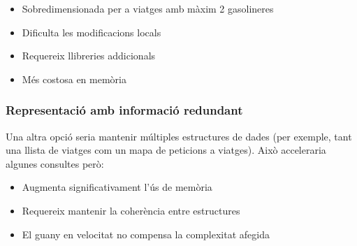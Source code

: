 \begin{itemize}
    \item Sobredimensionada per a viatges amb màxim 2 gasolineres
    \item Dificulta les modificacions locals
    \item Requereix llibreries addicionals
    \item Més costosa en memòria
\end{itemize}

\subsubsection{Representació amb informació redundant}

Una altra opció seria mantenir múltiples estructures de dades (per exemple, tant una llista de viatges com un mapa de peticions a viatges). Això acceleraria algunes consultes però:

\begin{itemize}
    \item Augmenta significativament l'ús de memòria
    \item Requereix mantenir la coherència entre estructures
    \item El guany en velocitat no compensa la complexitat afegida
\end{itemize}
